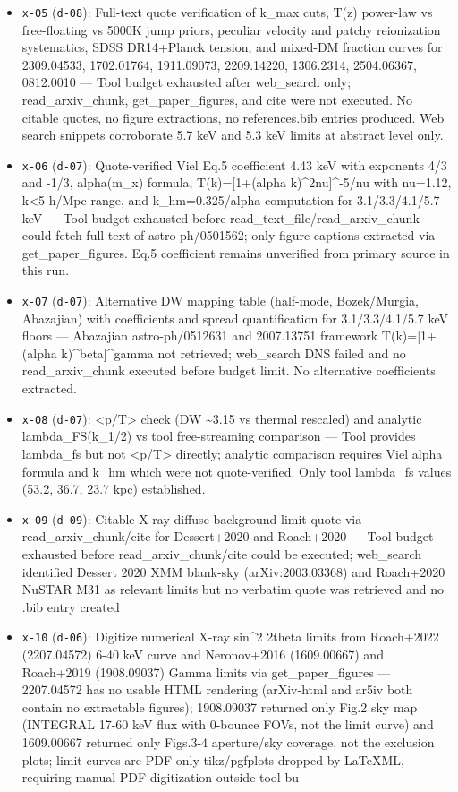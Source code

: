 \documentclass[11pt,a4paper]{article}
\begin{document}
\begin{itemize}
  \item \texttt{x-05} (\texttt{d-08}): Full-text quote verification of k\_max cuts, T(z) power-law vs free-floating vs 5000K jump priors, peculiar velocity and patchy reionization systematics, SDSS DR14+Planck tension, and mixed-DM fraction curves for 2309.04533, 1702.01764, 1911.09073, 2209.14220, 1306.2314, 2504.06367, 0812.0010 --- Tool budget exhausted after web\_search only; read\_arxiv\_chunk, get\_paper\_figures, and cite were not executed. No citable quotes, no figure extractions, no references.bib entries produced. Web search snippets corroborate 5.7 keV and 5.3 keV limits at abstract level only.
  \item \texttt{x-06} (\texttt{d-07}): Quote-verified Viel Eq.5 coefficient 4.43 keV with exponents 4/3 and -1/3, alpha(m\_x) formula, T(k)=[1+(alpha k)\textasciicircum{}2nu]\textasciicircum{}-5/nu with nu=1.12, k\textless{}5 h/Mpc range, and k\_hm=0.325/alpha computation for 3.1/3.3/4.1/5.7 keV --- Tool budget exhausted before read\_text\_file/read\_arxiv\_chunk could fetch full text of astro-ph/0501562; only figure captions extracted via get\_paper\_figures. Eq.5 coefficient remains unverified from primary source in this run.
  \item \texttt{x-07} (\texttt{d-07}): Alternative DW mapping table (half-mode, Bozek/Murgia, Abazajian) with coefficients and spread quantification for 3.1/3.3/4.1/5.7 keV floors --- Abazajian astro-ph/0512631 and 2007.13751 framework T(k)=[1+(alpha k)\textasciicircum{}beta]\textasciicircum{}gamma not retrieved; web\_search DNS failed and no read\_arxiv\_chunk executed before budget limit. No alternative coefficients extracted.
  \item \texttt{x-08} (\texttt{d-07}): \textless{}p/T\textgreater{} check (DW \textasciitilde{}3.15 vs thermal rescaled) and analytic lambda\_FS(k\_1/2) vs tool free-streaming comparison --- Tool provides lambda\_fs but not \textless{}p/T\textgreater{} directly; analytic comparison requires Viel alpha formula and k\_hm which were not quote-verified. Only tool lambda\_fs values (53.2, 36.7, 23.7 kpc) established.
  \item \texttt{x-09} (\texttt{d-09}): Citable X-ray diffuse background limit quote via read\_arxiv\_chunk/cite for Dessert+2020 and Roach+2020 --- Tool budget exhausted before read\_arxiv\_chunk/cite could be executed; web\_search identified Dessert 2020 XMM blank-sky (arXiv:2003.03368) and Roach+2020 NuSTAR M31 as relevant limits but no verbatim quote was retrieved and no .bib entry created
  \item \texttt{x-10} (\texttt{d-06}): Digitize numerical X-ray sin\textasciicircum{}2 2theta limits from Roach+2022 (2207.04572) 6-40 keV curve and Neronov+2016 (1609.00667) and Roach+2019 (1908.09037) Gamma limits via get\_paper\_figures --- 2207.04572 has no usable HTML rendering (arXiv-html and ar5iv both contain no extractable figures); 1908.09037 returned only Fig.2 sky map (INTEGRAL 17-60 keV flux with 0-bounce FOVs, not the limit curve) and 1609.00667 returned only Figs.3-4 aperture/sky coverage, not the exclusion plots; limit curves are PDF-only tikz/pgfplots dropped by LaTeXML, requiring manual PDF digitization outside tool bu

\end{itemize}
\end{document}
